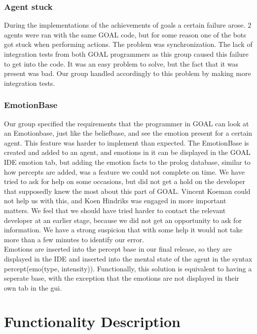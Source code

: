 \documentclass[11pt]{article}
\begin{document}
\subsubsection*{Agent stuck}
During the implementations of the achievements of goals a certain failure arose. 2 agents were ran with the same GOAL code, but for some reason one of the bots got stuck when performing actions. The problem was synchronization. The lack of integration tests from both GOAL programmers as this group caused this failure to get into the code. It was an easy problem to solve, but the fact that it was present was bad. Our group handled accordingly to this problem by making more integration tests. 

\subsubsection*{EmotionBase}
Our group specified the requirements that the programmer in GOAL can look at an Emotionbase, just like the beliefbase, and see the emotion present for a certain agent. This feature was harder to implement than expected. The EmotionBase is created and added to an agent, and emotions in it can be displayed in the GOAL IDE emotion tab, but adding the emotion facts to the prolog database, similar to how percepts are added, was a feature we could not complete on time. We have tried to ask for help on some occasions, but did not get a hold on the developer that supposedly knew the most about this part of GOAL. Vincent Koeman could not help us with this, and Koen Hindriks was engaged in more important matters. We feel that we should have tried harder to contact the relevant developer at an earlier stage, because we did not get an opportunity to ask for information. We have a strong suspicion that with some help it would not take more than a few minutes to identify our error.\\
Emotions are inserted into the percept base in our final release, so they are displayed in the IDE and inserted into the mental state of the agent in the syntax percept(emo(type, intensity)). Functionally, this solution is equivalent to having a seperate base, with the exception that the emotions are not displayed in their own tab in the gui. 


\section{Functionality Description}
\end{document}
